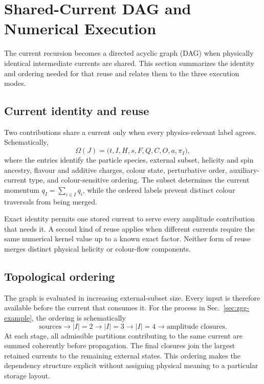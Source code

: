 \section{\texorpdfstring{Shared-Current DAG and Numerical Execution}{Shared-Current DAG and Numerical Execution}}
\label{sec:zgg-dag}

The current recursion becomes a directed acyclic graph (DAG) when physically
identical intermediate currents are shared. This section summarizes the
identity and ordering needed for that reuse and relates them to the three
execution modes.

\subsection{Current identity and reuse}

Two contributions share a current only when every physics-relevant label
agrees. Schematically,
\begin{equation}
 \Omega(J)=
 \bigl(t,I,H,s,F,Q,C,O,a,\pi_I\bigr),
 \label{eq:zgg-current-key}
\end{equation}
where the entries identify the particle species, external subset, helicity and
spin ancestry, flavour and additive charges, colour state, perturbative order,
auxiliary-current type, and colour-sensitive ordering. The subset determines
the current momentum \(q_I=\sum_{i\in I}q_i\), while the ordered labels prevent
distinct colour traversals from being merged.

Exact identity permits one stored current to serve every amplitude contribution
that needs it. A second kind of reuse applies when different currents require
the same numerical kernel value up to a known exact factor. Neither form of
reuse merges distinct physical helicity or colour-flow components.

\subsection{Topological ordering}

The graph is evaluated in increasing external-subset size. Every input is
therefore available before the current that consumes it. For the process in
Sec.~\ref{sec:zgg-example}, the ordering is schematically
\begin{equation}
 \boxed{\text{sources}}
 \longrightarrow
 \boxed{|I|=2}
 \longrightarrow
 \boxed{|I|=3}
 \longrightarrow
 \boxed{|I|=4}
 \longrightarrow
 \boxed{\text{amplitude closures}} .
 \label{eq:zgg-stage-chain}
\end{equation}
At each stage, all admissible partitions contributing to the same current are
summed coherently before propagation. The final closures join the largest
retained currents to the remaining external states. This ordering makes the
dependency structure explicit without assigning physical meaning to a
particular storage layout.

